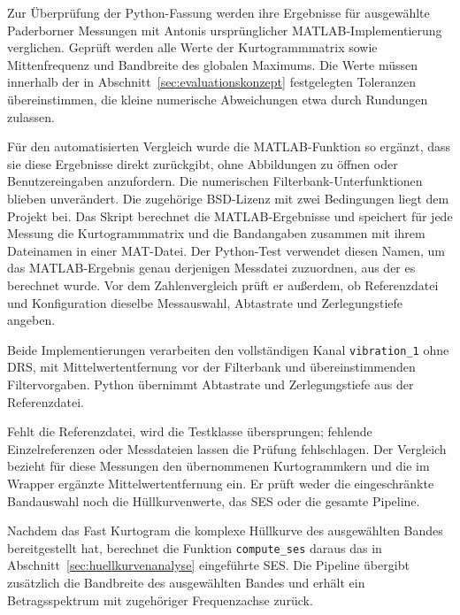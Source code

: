 Zur Überprüfung der Python-Fassung werden ihre Ergebnisse für ausgewählte
Paderborner Messungen mit Antonis ursprünglicher MATLAB-Implementierung
\cite{antoniFastKurtogram2015} verglichen. Geprüft werden alle Werte der
Kurtogrammmatrix sowie Mittenfrequenz und Bandbreite des globalen Maximums.
Die Werte müssen innerhalb der in Abschnitt~\ref{sec:evaluationskonzept}
festgelegten Toleranzen übereinstimmen, die kleine numerische Abweichungen
etwa durch Rundungen zulassen.

Für den automatisierten Vergleich wurde die MATLAB-Funktion so ergänzt,
dass sie diese Ergebnisse direkt zurückgibt, ohne Abbildungen zu öffnen
oder Benutzereingaben anzufordern. Die numerischen Filterbank-Unterfunktionen
blieben unverändert. Die zugehörige BSD-Lizenz mit zwei Bedingungen liegt
dem Projekt bei.
Das Skript  berechnet die
MATLAB-Ergebnisse und speichert für jede Messung die Kurtogrammmatrix und
die Bandangaben zusammen mit ihrem Dateinamen in einer MAT-Datei. Der
Python-Test verwendet diesen Namen, um das MATLAB-Ergebnis genau derjenigen
Messdatei zuzuordnen, aus der es berechnet wurde. Vor dem Zahlenvergleich
prüft er außerdem, ob Referenzdatei und Konfiguration dieselbe Messauswahl,
Abtastrate und Zerlegungstiefe angeben.

Beide Implementierungen verarbeiten den vollständigen Kanal
\texttt{vibration\_1} ohne DRS, mit Mittelwertentfernung vor der Filterbank
und übereinstimmenden Filtervorgaben. Python übernimmt Abtastrate und
Zerlegungstiefe aus der Referenzdatei.

Fehlt die Referenzdatei, wird die Testklasse übersprungen; fehlende
Einzelreferenzen oder Messdateien lassen die Prüfung fehlschlagen.
Der Vergleich bezieht für diese Messungen den übernommenen Kurtogrammkern
und die im Wrapper ergänzte Mittelwertentfernung ein. Er prüft weder die
eingeschränkte Bandauswahl noch die Hüllkurvenwerte, das SES oder die gesamte
Pipeline.
\par\endgroup

\label{subsec:ses_impl}
\begin{samepage}
Nachdem das Fast Kurtogram die komplexe Hüllkurve des ausgewählten Bandes
bereitgestellt hat, berechnet die Funktion \texttt{compute\_ses} daraus das
in Abschnitt~\ref{sec:huellkurvenanalyse} eingeführte \acrshort{SES}. Die
Pipeline übergibt zusätzlich die Bandbreite des ausgewählten Bandes und
erhält ein Betragsspektrum mit zugehöriger Frequenzachse zurück.
\par\end{samepage}

